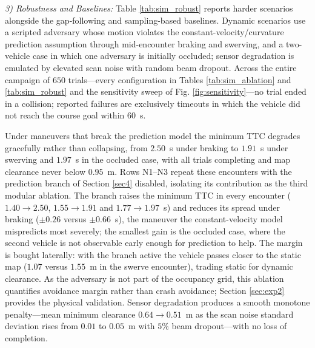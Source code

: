 \documentclass[journal]{IEEEtran}
\begin{document}
\textit{3) Robustness and Baselines:} Table \ref{tab:sim_robust} reports harder scenarios alongside the gap-following and sampling-based baselines. Dynamic scenarios use a scripted adversary whose motion violates the constant-velocity/curvature prediction assumption through mid-encounter braking and swerving, and a two-vehicle case in which one adversary is initially occluded; sensor degradation is emulated by elevated scan noise with random beam dropout. Across the entire campaign of $650$ trials---every configuration in Tables \ref{tab:sim_ablation} and \ref{tab:sim_robust} and the sensitivity sweep of Fig. \ref{fig:sensitivity}---no trial ended in a collision; reported failures are exclusively timeouts in which the vehicle did not reach the course goal within $60$~s.

Under maneuvers that break the prediction model the minimum TTC degrades gracefully rather than collapsing, from $2.50$~s under braking to $1.91$~s under swerving and $1.97$~s in the occluded case, with all trials completing and map clearance never below $0.95$~m. Rows N1--N3 repeat these encounters with the prediction branch of Section \ref{sec4} disabled, isolating its contribution as the third modular ablation. The branch raises the minimum TTC in every encounter ($1.40\!\rightarrow\!2.50$, $1.55\!\rightarrow\!1.91$ and $1.77\!\rightarrow\!1.97$~s) and reduces its spread under braking ($\pm0.26$ versus $\pm0.66$~s), the maneuver the constant-velocity model mispredicts most severely; the smallest gain is the occluded case, where the second vehicle is not observable early enough for prediction to help. The margin is bought laterally: with the branch active the vehicle passes closer to the static map ($1.07$ versus $1.55$~m in the swerve encounter), trading static for dynamic clearance. As the adversary is not part of the occupancy grid, this ablation quantifies avoidance margin rather than crash avoidance; Section \ref{sec:exp2} provides the physical validation. Sensor degradation produces a smooth monotone penalty---mean minimum clearance $0.64\!\rightarrow\!0.51$~m as the scan noise standard deviation rises from $0.01$ to $0.05$~m with $5\%$ beam dropout---with no loss of completion.
\end{document}
